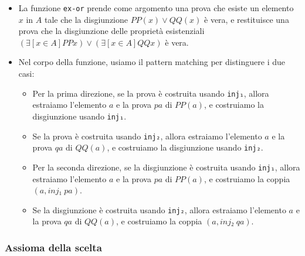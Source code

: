 \documentclass[a4paper]{article}
\theoremstyle{definition}
\theoremstyle{remark}
\begin{document}
\begin{itemize}
  \item La funzione \texttt{ex-or} prende come argomento una prova che esiste un elemento \( x \) in \( A \) tale che la disgiunzione \( PP(x) ∨ QQ(x) \) è vera, e restituisce una prova che la disgiunzione delle proprietà esistenziali \( (∃[ x ∈ A ] PP x) ∨ (∃[ x ∈ A ] QQ x) \) è vera.
  \item Nel corpo della funzione, usiamo il pattern matching per distinguere i due casi:
    \begin{itemize}
      \item Per la prima direzione, se la prova è costruita usando \texttt{inj₁}, allora estraiamo l'elemento \( a \) e la prova \( pa \) di \( PP(a) \), e costruiamo la disgiunzione usando \texttt{inj₁}.
      \item Se la prova è costruita usando \texttt{inj₂}, allora estraiamo l'elemento \( a \) e la prova \( qa \) di \( QQ(a) \), e costruiamo la disgiunzione usando \texttt{inj₂}.
      \item Per la seconda direzione, se la disgiunzione è costruita usando \texttt{inj₁}, allora estraiamo l'elemento \( a \) e la prova \( pa \) di \( PP(a) \), e costruiamo la coppia \( (a , inj₁ \; pa) \).
      \item Se la disgiunzione è costruita usando \texttt{inj₂}, allora estraiamo l'elemento \( a \) e la prova \( qa \) di \( QQ(a) \), e costruiamo la coppia \( (a , inj₂\; qa) \).
    \end{itemize}
\end{itemize}

\subsubsection{Assioma della scelta}
\end{document}
